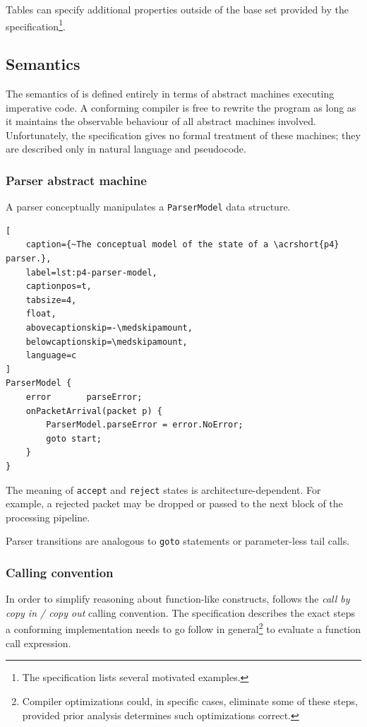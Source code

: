 Tables can specify additional properties outside of the base set provided by the
\pfs specification\footnote{The specification lists several motivated
examples.}.

\subsection{Semantics}

The semantics of \pfs is defined entirely in terms of abstract machines
executing imperative code. A conforming compiler is free to rewrite the \pfs
program as long as it maintains the observable behaviour of all abstract
machines involved. Unfortunately, the specification gives no formal treatment
of these machines; they are described only in natural language and pseudocode.



\subsubsection*{Parser abstract machine}

A parser conceptually manipulates a \texttt{ParserModel} data structure.

\begin{lstlisting}[
	caption={~The conceptual model of the state of a \acrshort{p4} parser.},
	label=lst:p4-parser-model,
	captionpos=t,
	tabsize=4,
	float,
	abovecaptionskip=-\medskipamount,
	belowcaptionskip=\medskipamount,
	language=c
]
ParserModel {
    error       parseError;
    onPacketArrival(packet p) {
        ParserModel.parseError = error.NoError;
        goto start;
    }
}
\end{lstlisting}

The meaning of \texttt{accept} and \texttt{reject} states is
architecture-dependent. For example, a rejected packet may be dropped or
passed to the next block of the processing pipeline.

Parser transitions are analogous to \texttt{goto} statements or parameter-less
tail calls.

\subsubsection*{Calling convention}

In order to simplify reasoning about function-like constructs, \pfs follows the
\emph{call by copy in / copy out} calling convention. The specification
describes the exact steps a conforming implementation needs to go follow in
general\footnote{Compiler optimizations could, in specific cases, eliminate some
of these steps, provided prior analysis determines such optimizations correct.}
to evaluate a function call expression.

